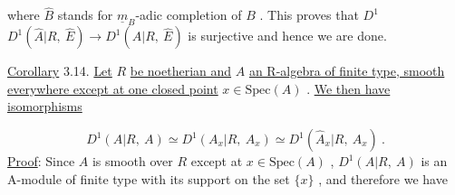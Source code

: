 \begin{center}
\end{center}
where  $\hat{B}$  stands for  $\underline{m}_B$-adic completion of  $B$  . This proves that  $D^1$
$D^1(\hat{A}|R,\ \hat{E}) \to D^1(A|R,\ \hat{E})$  is surjective and hence we are done.



\underline{Corollary} 3.14. \underline{Let}  $R$  \underline{be noetherian and}  $A$  \underline{an R-algebra of finite type, smooth everywhere except at one closed point}  $x \in \mathrm{Spec}(A)$  . \underline{We then have isomorphisms}

\begin{equation*}
D^1(A|R,\ A) \simeq D^1(A_x|R,\ A_x) \simeq D^1(\hat{A}_x|R,\ \hat{A}_x)\ .
\end{equation*}
\underline{Proof}: Since  $A$  is smooth over  $R$  except at  $x \in \mathrm{Spec}(A)$  ,  $D^1(A|R,\ A)$  is an A-module of finite type with its support on the set  $\{x\}$  , and therefore we have

